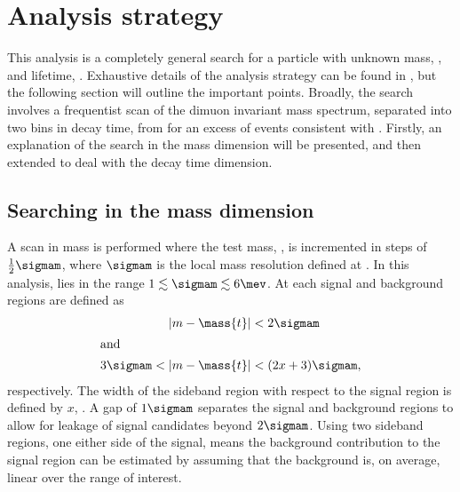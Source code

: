 \section{Analysis strategy}
\label{sec:db:strategy}

This analysis is a completely general search for a particle with unknown mass, \mass\db, and
lifetime, \lifetime\db.
Exhaustive details of the analysis strategy can be found in , but the
following section will outline the important points.
Broadly, the search involves a frequentist scan of the dimuon invariant mass spectrum,
separated into two bins in decay time, from
\btokstrmumu for an excess of events consistent with \dbtomumu.
Firstly, an explanation of the search in the mass dimension will be presented, and then extended to
deal with the decay time dimension.


\subsection{Searching in the mass dimension}
A scan in mass is performed where the test mass, , is incremented in steps of
$\tfrac12\sigmam$, where $\sigmam$ is the local mass resolution defined at .
In this analysis, \sigmam lies in the range $1\lesssim\sigmam\lesssim6\mev$.
At each  signal and background regions are defined as
\begin{align}
  |m-\mass{t}|&<2\sigmam \\
  \intertext{and}
  3\sigmam<|m-\mass{t}|&<(2x+3)\sigmam,
\end{align}
respectively.
The width of the sideband region with respect to the signal region is defined by $x$, .
A gap of $1\sigmam$ separates the signal and background regions to allow for leakage of signal
candidates beyond $2\sigmam$.
Using two sideband regions, one either side of the signal, means the background contribution to the
signal region can be estimated by assuming that the background is, on average, linear over the
range of interest.

